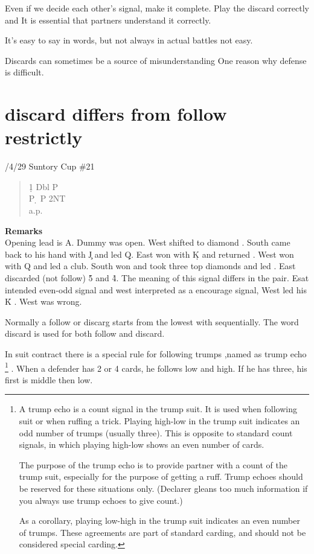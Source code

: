 
Even if we decide each other's signal, make it complete.
Play the discard correctly and
It is essential that partners understand it correctly.

It's easy to say in words, but not always in actual battles
not easy.

Discards can sometimes be a source of misunderstanding
One reason why defense is difficult.

\section{discard differs from follow restrictly}
/4/29 Suntory Cup \#21
\begin{quote}
%
  {}%
  {}
  {}%
  {}%
\end{quote}
\begin{quote}
\begin{bidding}
1\d  \> Dbl   \> P \c \\
P \d \> P \> 2NT \\
a.p.
\end{bidding}
\end{quote}
{\bf Remarks}\\

Opening lead is \s A. Dummy was open.  West shifted to diamond .
South came back to his hand with \c J  and led \d Q. East won with
\d K and returned . West won with \s Q and led a club.
South won and took three top diamonds and led . East discarded
(not follow) \h 5 and \h 4. The meaning of this signal differs
in the pair. Esat intended even-odd signal and west interpreted as
a encourage signal, West led his \h K . West was wrong.

Normally a follow or discarg starts from the lowest with 
sequentially. The word discard is used for both follow and discard.

In suit contract there is a special rule for following trumps
,named as trump echo \footnote{
A trump echo is a count signal in the trump suit. It is used when following suit or when ruffing a trick. Playing high-low in the trump suit indicates an odd number of trumps (usually three). This is opposite to standard count signals, in which playing high-low shows an even number of cards.

The purpose of the trump echo is to provide partner with a count of the trump suit, especially for the purpose of getting a ruff. Trump echoes should be reserved for these situations only. (Declarer gleans too much information if you always use trump echoes to give count.)

As a corollary, playing low-high in the trump suit indicates an even number of trumps. These agreements are part of standard carding, and should not be considered special carding.

}
. When a defender has 2 or 4 cards,
he follows low and high.
If he has three, his first is middle then low.

